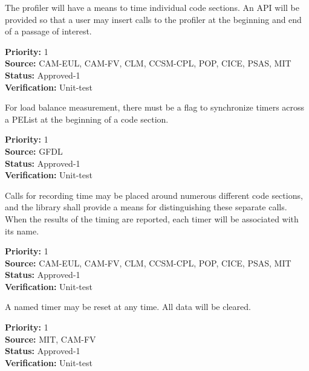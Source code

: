 

The profiler will have a means to time individual code sections.  An API will be 
provided so that a user may insert calls to the profiler at the beginning and
end of a passage of interest.

\begin{reqlist}
{\bf Priority:} 1 \\
{\bf Source:} CAM-EUL, CAM-FV, CLM, CCSM-CPL, POP, CICE, PSAS, MIT \\
{\bf Status:} Approved-1 \\
{\bf Verification:} Unit-test 
\end{reqlist}


For load balance measurement, there must be a flag to synchronize
timers across a PEList at the beginning of a code section.

\begin{reqlist}
{\bf Priority:} 1 \\
{\bf Source:} GFDL \\
{\bf Status:} Approved-1 \\
{\bf Verification:} Unit-test 
\end{reqlist}


Calls for recording time may be placed around numerous different code sections, 
and the library shall provide a means for distinguishing these separate calls.  When
the results of the timing are reported, each timer will be associated with its name.

\begin{reqlist}
{\bf Priority:} 1 \\
{\bf Source:} CAM-EUL, CAM-FV, CLM, CCSM-CPL, POP, CICE, PSAS, MIT \\
{\bf Status:} Approved-1 \\
{\bf Verification:} Unit-test 
\end{reqlist}


A named timer may be reset at any time.  All data will be cleared.

\begin{reqlist}
{\bf Priority:} 1 \\
{\bf Source:} MIT, CAM-FV \\
{\bf Status:} Approved-1 \\
{\bf Verification:} Unit-test 
\end{reqlist}

